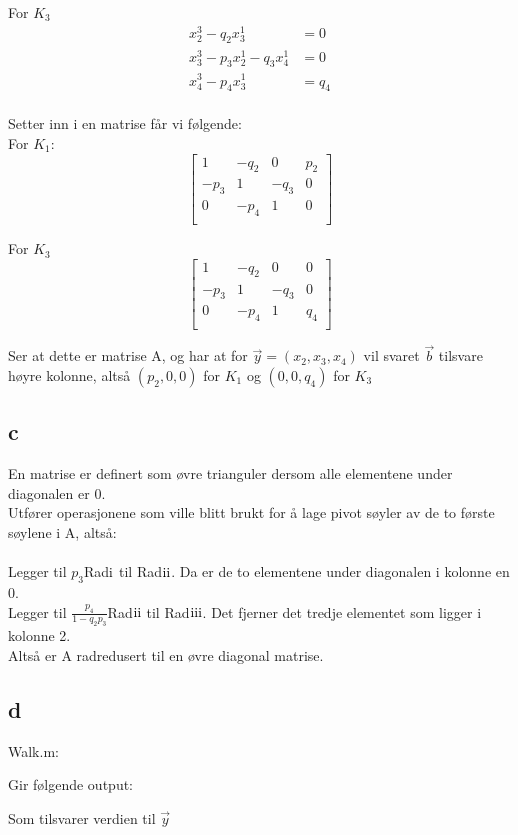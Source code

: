 \documentclass[a4paper, norsk, twoside, 10pt]{article}
\newcommand{\RN}[1]{
  \textup{\uppercase\expandafter{\romannumeral#1}}%
}
\begin{document}
\begin{flushleft}
   For $K_{3}$
   \begin{align*}
     x_{2}^{3}  - q_{2}x_{3}^{1} &= 0\\
     x_{3}^{3} - p_{3}x_{2}^{1} - q_{3}x_{4}^{1}&= 0\\
     x_{4}^{3} - p_{4}x_{3}^{1} &= q_{4}\\
   \end{align*}   

   
   Setter inn i en matrise får vi følgende:\\
   For $K_{1}$:
   \[\begin{bmatrix}
   1 & - q_{2} & 0 & p_{2}\\
   -p_{3} & 1 & -q_{3} & 0 \\
   0 & -p_{4} & 1 & 0 \\
   \end{bmatrix}\]


   For $K_{3}$
   \[\begin{bmatrix}
   1 & - q_{2} & 0 & 0\\
   -p_{3} & 1 & -q_{3} & 0 \\
   0 & -p_{4} & 1 & q_{4} \\
   \end{bmatrix}\]
   
   Ser at dette er matrise A, og har at for $\vec{y} = (x_{2}, x_{3}, x_{4})$ vil svaret $\vec{b}$ tilsvare høyre kolonne, altså $(p_{2}, 0, 0)$ for $K_{1}$ og $(0, 0, q_{4})$ for $K_{3}$



   \subsection*{c}
   En matrise er definert som øvre trianguler dersom alle elementene under diagonalen er 0. \\

   Utfører operasjonene som ville blitt brukt for å lage pivot søyler av de to første søylene i A, altså: \\ \ \\
   Legger til $p_{3}$Rad$\RN{1}$ til Rad$\RN{2}$. Da er de to elementene under diagonalen i kolonne en 0.\\
   Legger til $\frac{p_{4}}{1 - q_{2}p_{3}}$Rad$\RN{2}$ til Rad$\RN{3}$. Det fjerner det tredje elementet som ligger i kolonne 2.
   \\
   Altså er A radredusert til en øvre diagonal matrise.



   \subsection*{d}

   Walk.m:
  
 
  Gir følgende output:
  

  Som tilsvarer verdien til $\vec{y}$
  \end{flushleft}
\end{document}
